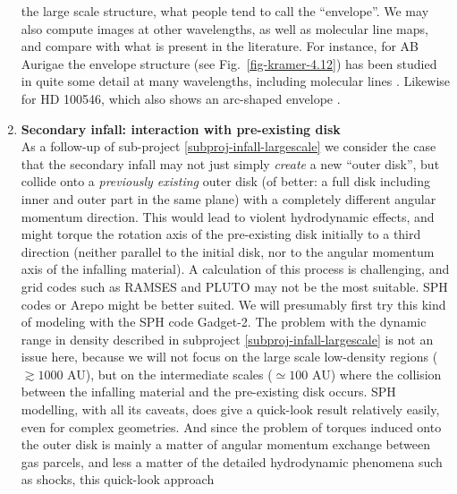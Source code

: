 \documentclass[10pt,fleqn,twoside,a4paper]{article}
\begin{document}
\begin{enumerate}
  the large scale structure, what people tend to call the ``envelope''.  We
  may also compute images at other wavelengths, as well as molecular line
  maps, and compare with what is present in the literature. For instance,
  for AB Aurigae the envelope structure (see Fig.~\ref{fig-kramer-4.12}) has
  been studied in quite some detail at many wavelengths, including molecular
  lines \citep{2005ApJ...621..853S}. Likewise for HD 100546, which also 
  shows an arc-shaped envelope \citep{2007ApJ...665..512A}.
\item {\bf Secondary infall: interaction with pre-existing disk}\label{subproj-infall-interact}\\
  As a follow-up of sub-project \ref{subproj-infall-largescale} we consider
  the case that the secondary infall may not just simply {\em create} a new
  ``outer disk'', but collide onto a {\em previously existing} outer disk
  (of better: a full disk including inner and outer part in the same plane) 
  with a completely different angular momentum direction. This would lead to
  violent hydrodynamic effects, and might torque the rotation axis of the
  pre-existing disk initially to a third direction (neither parallel to the
  initial disk, nor to the angular momentum axis of the infalling
  material). A calculation of this process is challenging, and grid codes
  such as RAMSES and PLUTO may not be the most suitable. SPH codes or Arepo
  might be better suited. We will presumably first try this kind of modeling
  with the SPH code Gadget-2. The problem with the dynamic range in density
  described in subproject \ref{subproj-infall-largescale} is not an issue
  here, because we will not focus on the large scale low-density regions
  ($\gtrsim 1000$ AU), but on the intermediate scales ($\simeq 100$ AU)
  where the collision between the infalling material and the pre-existing
  disk occurs. SPH modelling, with all its caveats, does give a quick-look
  result relatively easily, even for complex geometries. And since the
  problem of torques induced onto the outer disk is mainly a matter of
  angular momentum exchange between gas parcels, and less a matter of the
  detailed hydrodynamic phenomena such as shocks, this quick-look approach

\end{enumerate}
\end{document}
